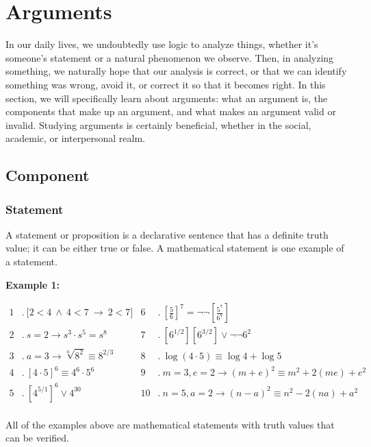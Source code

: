 \documentclass[12pt,a4paper,openany]{article}
\begin{document}
\section{Arguments}

In our daily lives, we undoubtedly use logic to analyze things, whether it's someone's statement or a natural phenomenon we observe. 
Then, in analyzing something, we naturally hope that our analysis is correct, or that we can identify something was wrong, avoid it, or correct it so that it becomes right. 
In this section, we will specifically learn about arguments: what an argument is, the components that make up an argument, and what makes an argument valid or invalid.
Studying arguments is certainly beneficial, whether in the social, academic, or interpersonal realm.

\subsection {Component}

\subsubsection{ Statement}\label{statement}

A statement or proposition is a declarative sentence that has a definite truth value; it can be either true or false.  A mathematical statement is one example of a statement.

\textbf{Example 1:}

$$
\begin{aligned}
1 &.\ \displaystyle\bigl[2<4 \ \wedge \ 4<7 \ \to \ 2<7 \bigr]
& 6 &.\ \left[\frac{5}{6}\right]^7 = \neg \neg \left[\frac{5^7}{6^7}\right] \\[2mm]
2 &.\ s =2 \to s^3 \cdot s^5 = s^8
& 7 &.\ \left[6^{1/2}\right]\left[6^{3/2}\right] \lor \neg \neg 6^2 \\[2mm]
3 &.\ a = 3 \to \sqrt[a]{8^2} \equiv 8^{2/3}
& 8 &.\ \log(4 \cdot 5) \equiv \log 4 + \log 5 \\[2mm]
4 &.\ \left[4 \cdot 5\right]^6 \equiv 4^6 \cdot 5^6
& 9 &.\ m = 3, e = 2 \to (m+e)^2 \equiv m^2 + 2(me) + e^2 \\[2mm]
5 &.\ \left[4^{5/1}\right]^6 \lor 4^{30}
& 10 &.\ n = 5, a = 2 \to (n-a)^2 \equiv n^2 - 2(na) + a^2 \\[4mm]
\end{aligned}
$$

All of the examples above are mathematical statements with truth values that can be verified.
\end{document}
